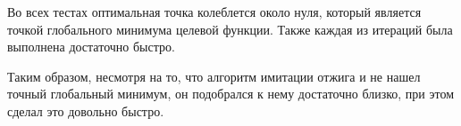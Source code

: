 \documentclass[../main.tex]{subfiles}
\begin{document}
	Во всех тестах оптимальная точка колеблется около нуля, который является точкой глобального минимума целевой функции. Также каждая из итераций была выполнена достаточно быстро.
	
	Таким образом, несмотря на то, что алгоритм имитации отжига и не нашел точный глобальный минимум, он подобрался к нему достаточно близко, при этом сделал это довольно быстро.
	
	
\end{document}
